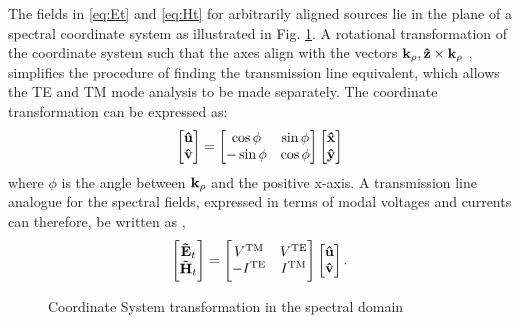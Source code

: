\documentclass[12pt]{article}
\begin{document}
The fields in \eqref{eq:Et} and  \eqref{eq:Ht} for arbitrarily aligned sources lie in the plane of a spectral coordinate system as illustrated in Fig. \ref{fig:SpCS}. A rotational transformation of the coordinate system such that the axes align with the vectors $\mathbf{k}_{\rho}, \mathbf{\hat z} \times \mathbf{k}_{\rho}$ \cite{itoh1980}, simplifies the procedure of finding the transmission line equivalent, which allows the TE and TM mode analysis to be made separately. The coordinate transformation can be expressed as:
%
\begin{equation}
  \begin{bmatrix}
    \mathbf{\hat u} \\
    \mathbf{\hat v}
  \end{bmatrix}
  =
  \begin{bmatrix}
    \cos \phi & \sin \phi \\
    -\sin \phi & \cos \phi
  \end{bmatrix}
  \begin{bmatrix}
    \mathbf{\hat x} \\
    \mathbf{\hat y}
  \end{bmatrix}
  \label{eq:transformation}
\end{equation}
%
where $\phi$ is the angle between $\mathbf{k_{\rho}}$ and the positive x-axis. A transmission line analogue for the spectral fields, expressed in terms of modal voltages and currents can therefore, be written as \cite{kastner1988, michalski1997multilayered},
%
\begin{equation}
  \begin{bmatrix}
    \mathbf{\tilde{E}}_t \\
    \mathbf{\tilde{H}}_t
  \end{bmatrix}
  =
  \begin{bmatrix}
    V^{\mathrm{TM}} & V^{\mathrm{TE}} \\
    -I^{\mathrm{\mathrm{TE}}} & I^{\mathrm{TM}}
  \end{bmatrix}
  \begin{bmatrix}
    \mathbf{\hat u} \\
    \mathbf{\hat v}
  \end{bmatrix}
  \label{eq:EHVI}.
\end{equation}
%
\begin{figure}[t!]
  \centering
  \def\svgwidth{.75\linewidth}
  
  \caption{Coordinate System transformation in the spectral domain}
  \label{fig:SpCS}
\end{figure}
\end{document}
